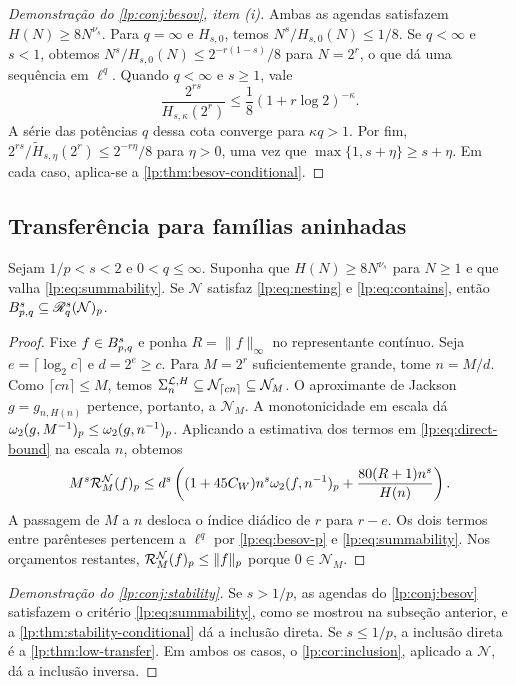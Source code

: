 \documentclass[12pt,a4paper]{article}
\begin{document}
\begin{proof}[Demonstração do \cref{lp:conj:besov}, item (i)]
Ambas as agendas satisfazem $H(N)\ge8N^{\nu_s}$. Para $q=\infty$ e $H_{s,0}$, temos $N^s/H_{s,0}(N)\le1/8$. Se $q<\infty$ e $s<1$, obtemos
$N^s/H_{s,0}(N)\le2^{-r(1-s)}/8$ para $N=2^r$, o que dá uma sequência em $\ell^q$.
Quando $q<\infty$ e $s\ge1$, vale
\[
 \frac{2^{rs}}{H_{s,\kappa}(2^r)}\le\frac{1}{8}(1+r\log 2)^{-\kappa}.
\]
A série das potências $q$ dessa cota converge para $\kappa q>1$. Por fim,
$2^{rs}/\widetilde H_{s,\eta}(2^r)\le2^{-r\eta}/8$ para $\eta>0$, uma vez que $\max\{1,s+\eta\}\ge s+\eta$. Em cada caso, aplica-se a \cref{lp:thm:besov-conditional}.
\end{proof}

\subsection{Transferência para famílias aninhadas}

\begin{proposicao}
\label{lp:thm:stability-conditional}
Sejam $1/p<s<2$ e $0<q\le\infty$. Suponha que $H(N)\ge8N^{\nu_s}$ para $N\ge1$ e que valha \eqref{lp:eq:summability}. Se $\mathcal N$ satisfaz \eqref{lp:eq:nesting} e \eqref{lp:eq:contains}, então $B^{s}_{p,q}\subseteq\mathscr R^{s}_{q}(\mathcal N)_p$.
\end{proposicao}

\begin{proof}
Fixe $f\in B^{s}_{p,q}$ e ponha $R=\|f\|_\infty$ no representante contínuo. Seja $e=\lceil\log_2 c\rceil$ e $d=2^e\ge c$. Para $M=2^r$ suficientemente grande, tome $n=M/d$. Como $\lceil cn\rceil\le M$, temos
$\Sigma_{n}^{\mathcal L,H}\subseteq\mathcal N_{\lceil cn\rceil}\subseteq\mathcal N_M$.
O aproximante de Jackson $g=g_{n,H(n)}$ pertence, portanto, a $\mathcal N_M$.
A monotonicidade em escala dá $\omega_2(g,M^{-1})_{p}\le\omega_2(g,n^{-1})_{p}$. Aplicando a estimativa dos termos em \eqref{lp:eq:direct-bound} na escala $n$, obtemos
\[
 M^s\mathcal R^{\mathcal N}_{M}(f)_p
 \le d^s\left((1+45C_W)n^s\omega_2(f,n^{-1})_{p}+\frac{80(R+1)n^s}{H(n)}\right).
\]
A passagem de $M$ a $n$ desloca o índice diádico de $r$ para $r-e$. Os dois termos entre parênteses pertencem a $\ell^q$ por \eqref{lp:eq:besov-p} e \eqref{lp:eq:summability}. Nos orçamentos restantes, $\mathcal R^{\mathcal N}_{M}(f)_p\le\|f\|_p$ porque $0\in\mathcal N_M$.
\end{proof}

\begin{proof}[Demonstração do \cref{lp:conj:stability}]
Se $s>1/p$, as agendas do \cref{lp:conj:besov} satisfazem o critério \eqref{lp:eq:summability}, como se mostrou na subseção anterior, e a \cref{lp:thm:stability-conditional} dá a inclusão direta. Se $s\le1/p$, a inclusão direta é a \cref{lp:thm:low-transfer}. Em ambos os casos, o \cref{lp:cor:inclusion}, aplicado a $\mathcal N$, dá a inclusão inversa.
\end{proof}
\end{document}
